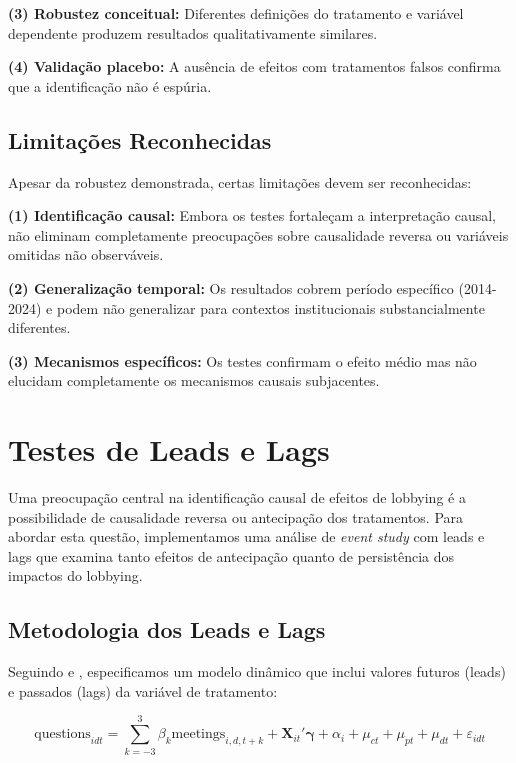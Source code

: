 \textbf{(3) Robustez conceitual:} Diferentes definições do tratamento e variável dependente produzem resultados qualitativamente similares.

\textbf{(4) Validação placebo:} A ausência de efeitos com tratamentos falsos confirma que a identificação não é espúria.

\subsection{Limitações Reconhecidas}

Apesar da robustez demonstrada, certas limitações devem ser reconhecidas:

\textbf{(1) Identificação causal:} Embora os testes fortaleçam a interpretação causal, não eliminam completamente preocupações sobre causalidade reversa ou variáveis omitidas não observáveis.

\textbf{(2) Generalização temporal:} Os resultados cobrem período específico (2014-2024) e podem não generalizar para contextos institucionais substancialmente diferentes.

\textbf{(3) Mecanismos específicos:} Os testes confirmam o efeito médio mas não elucidam completamente os mecanismos causais subjacentes.

\section{Testes de Leads e Lags}

Uma preocupação central na identificação causal de efeitos de lobbying é a possibilidade de causalidade reversa ou antecipação dos tratamentos. Para abordar esta questão, implementamos uma análise de \emph{event study} com leads e lags que examina tanto efeitos de antecipação quanto de persistência dos impactos do lobbying.

\subsection{Metodologia dos Leads e Lags}

Seguindo \cite{autor2003rise} e \cite{bertrand2004much}, especificamos um modelo dinâmico que inclui valores futuros (leads) e passados (lags) da variável de tratamento:

\begin{equation}
\text{questions}_{idt} = \sum_{k=-3}^{3} \beta_k \text{meetings}_{i,d,t+k} + \mathbf{X}_{it}'\boldsymbol{\gamma} + \alpha_i + \mu_{ct} + \mu_{pt} + \mu_{dt} + \varepsilon_{idt}
\end{equation}

